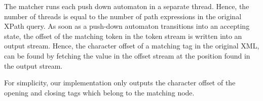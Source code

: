 The matcher runs each push down automaton in a separate thread. Hence, the
number of threads is equal to the number of path expressions in the original
XPath query. As soon as a push-down automaton transitions into an accepting
state, the offset of the matching token in the token stream is written into an
output stream. Hence, the character offset of a matching tag in the original
XML, can be found by fetching the value in the offset stream at the position
found in the output stream.

For simplicity, our implementation only outputs the character offset of the
opening and closing tags which belong to the matching node.




